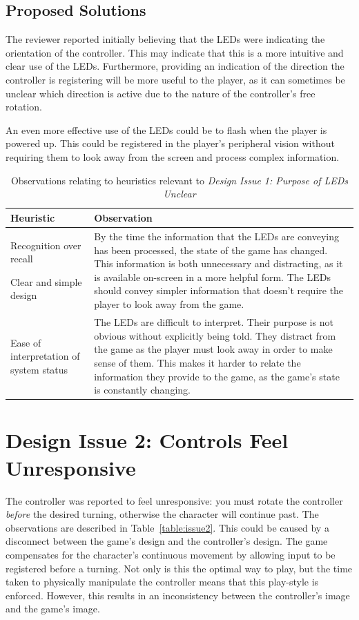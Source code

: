 \documentclass{scrartcl}
\begin{document}
\subsection{Proposed Solutions}
The reviewer reported initially believing that the LEDs were indicating the orientation of the controller. This may indicate that this is a more intuitive and clear use of the LEDs. Furthermore, providing an indication of the direction the controller is registering will be more useful to the player, as it can sometimes be unclear which direction is active due to the nature of the controller's free rotation. 

An even more effective use of the LEDs could be to flash when the player is powered up. This could be registered in the player's peripheral vision without requiring them to look away from the screen and process complex information.

\begin{table}[h]
\centering
\begin{tabular}{|m{5cm}|m{6cm}|}
\hline
\textbf{Heuristic} & \textbf{Observation} \\ \hline
Recognition over recall \par Clear and simple design & 
By the time the information that the LEDs are conveying has been processed, the state of the game has changed. This information is both unnecessary and distracting, as it is available on-screen in a more helpful form. The LEDs should convey simpler information that doesn't require the player to look away from the game. \\ \hline
Ease of interpretation of system status & 
The LEDs are difficult to interpret. Their purpose is not obvious without explicitly being told. They distract from the game as the player must look away in order to make sense of them. This makes it harder to relate the information they provide to the game, as the game's state is constantly changing. \\ \hline
\end{tabular}
\caption{Observations relating to heuristics relevant to \textit{Design Issue 1: Purpose of LEDs Unclear}}
\label{table:issue1}
\end{table}

\section{Design Issue 2: Controls Feel Unresponsive}
The controller was reported to feel unresponsive: you must rotate the controller \textit{before} the desired turning, otherwise the character will continue past. The observations are described in Table~\ref{table:issue2}. This could be caused by a disconnect between the game's design and the controller's design. The game compensates for the character's continuous movement by allowing input to be registered before a turning. Not only is this the optimal way to play, but the time taken to physically manipulate the controller means that this play-style is enforced. However, this results in an inconsistency between the controller's image and the game's image.
\end{document}
